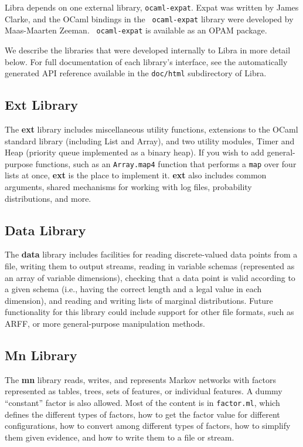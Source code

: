 \documentclass[11pt]{article}
\begin{document}
Libra depends on one external library, {\tt ocaml-expat}.  Expat was
written by James Clarke, and the OCaml bindings in the {\tt
ocaml-expat} library were developed by Maas-Maarten Zeeman.  {\tt
ocaml-expat} is available as an OPAM package.

We describe the libraries that were developed internally to Libra in
more detail below.  For full documentation of each library's
interface, see the automatically generated API reference available in
the {\tt doc/html} subdirectory of Libra.

\subsection{Ext Library}

The {\bf ext} library includes miscellaneous utility functions,
extensions to the OCaml standard library (including List and Array),
and two utility modules, Timer and Heap (priority queue implemented as
a binary heap).  If you wish to add general-purpose functions, such as
an {\tt Array.map4} function that performs a {\tt map} over four lists
at once, {\bf ext} is the place to implement it.  {\bf ext} also
includes common arguments, shared mechanisms for working with log
files, probability distributions, and more.

\subsection{Data Library}

The {\bf data} library includes facilities for reading discrete-valued
data points from a file, writing them to output streams, reading in
variable schemas (represented as an array of variable dimensions),
checking that a data point is valid according to a given schema (i.e.,
having the correct length and a legal value in each dimension), and
reading and writing lists of marginal distributions.  Future
functionality for this library could include support for other file
formats, such as ARFF, or more general-purpose manipulation methods.

\subsection{Mn Library}

The {\bf mn} library reads, writes, and represents Markov networks
with factors represented as tables, trees, sets of features, or
individual features.  A dummy ``constant'' factor is also allowed.
Most of the content is in {\tt factor.ml}, which defines the different
types of factors, how to get the factor value for different
configurations, how to convert among different types of factors, how
to simplify them given evidence, and how to write them to a file or
stream.
\end{document}
